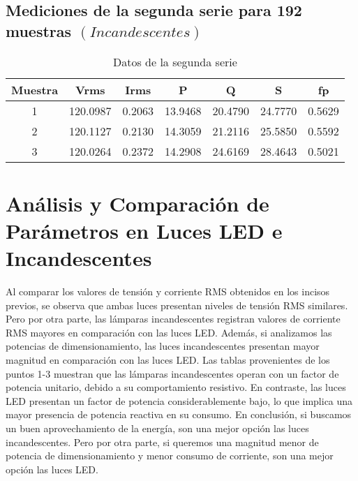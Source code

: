 \documentclass[conference]{IEEEtran}
\theoremstyle{mytheoremstyle}
\theoremstyle{mytheoremstyle}
\theoremstyle{myproblemstyle}
\begin{document}
        \newpage

        \subsection*{Mediciones de la segunda serie para 192 muestras $(Incandescentes)$}
        \begin{table}[h]
        \centering
        \caption{Datos de la segunda serie}
        \begin{tabular}{@{}ccccccc@{}}
        \toprule
        \textbf{Muestra} & \textbf{Vrms} & \textbf{Irms} & \textbf{P} & \textbf{Q} & \textbf{S} & \textbf{fp} \\ \midrule
        1 & 120.0987 & 0.2063 & 13.9468 & 20.4790 & 24.7770 & 0.5629 \\
        2 & 120.1127 & 0.2130 & 14.3059 & 21.2116 & 25.5850 & 0.5592 \\
        3 & 120.0264 & 0.2372 & 14.2908 & 24.6169 & 28.4643 & 0.5021 \\ \bottomrule
        \end{tabular}
        \end{table}


        \section{Análisis y Comparación de Parámetros en Luces LED e Incandescentes}  
        Al comparar los valores de tensión y corriente RMS obtenidos en los incisos previos, se observa que ambas luces presentan niveles de tensión RMS similares. Pero por otra parte, las lámparas incandescentes registran valores de corriente RMS mayores en comparación con las luces LED. Además, si analizamos las potencias de dimensionamiento, las luces incandescentes presentan mayor magnitud en comparación con las luces LED. Las tablas provenientes de los puntos 1-3 muestran que las lámparas incandescentes operan con un factor de potencia unitario, debido a su comportamiento resistivo. En contraste, las luces LED presentan un factor de potencia considerablemente bajo, lo que implica una mayor presencia de potencia reactiva en su consumo. En conclusión, si buscamos un buen aprovechamiento de la energía, son una mejor opción las luces incandescentes. Pero por otra parte, si queremos una magnitud menor de potencia de dimensionamiento y menor consumo de corriente, son una mejor opción las luces LED.
        \\
\end{document}
